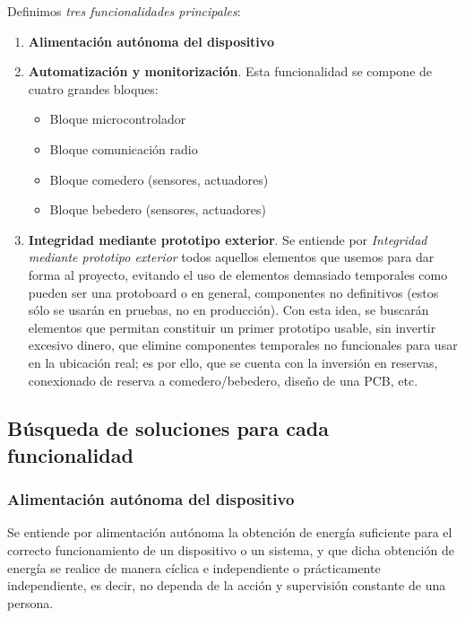 \documentclass[12pt]{article}
\begin{document}
	\noindent Definimos \textit{tres funcionalidades principales}: 
	
	\begin{enumerate}
		\item \textbf{Alimentación autónoma del dispositivo}
		\item \textbf{Automatización y monitorización}. Esta funcionalidad se compone de cuatro grandes bloques:
		\begin{itemize}
			\item Bloque microcontrolador
			\item Bloque comunicación radio 
			\item Bloque comedero (sensores, actuadores)
			\item Bloque bebedero (sensores, actuadores)
		\end{itemize}
	
		\item \textbf{Integridad mediante prototipo exterior}. Se entiende por \textit{Integridad mediante prototipo exterior} todos aquellos elementos que usemos para dar forma al proyecto, evitando el uso de elementos demasiado temporales como pueden ser una protoboard o en general, componentes no definitivos (estos sólo se usarán en pruebas, no en producción). Con esta  idea, se buscarán elementos que permitan constituir un primer prototipo usable, sin invertir excesivo dinero, que elimine componentes temporales no funcionales para usar en la ubicación real; es por ello, que se cuenta con la inversión en reservas, conexionado de reserva a comedero/bebedero, diseño de una PCB, etc.
	\end{enumerate}
	
	\subsection[Búsqueda soluciones]{Búsqueda de soluciones para cada funcionalidad}

	\subsubsection{Alimentación autónoma del dispositivo}
	\label{subseccion 3.2.1: búsqueda soluciones alimentación}
	\noindent Se entiende por alimentación autónoma la obtención de energía suficiente para el correcto funcionamiento de un dispositivo o un sistema, y que dicha obtención de energía se realice de manera cíclica e independiente o prácticamente independiente, es decir, no dependa de la acción y supervisión constante de una persona. \\
	
\end{document}
